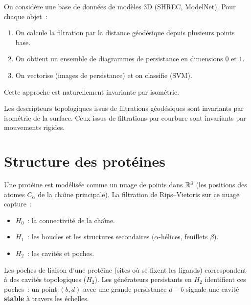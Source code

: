\begin{exemple}
On consid\`ere une base de donn\'ees de mod\`eles 3D (SHREC, ModelNet).
Pour chaque objet~:
\begin{enumerate}
  \item On calcule la filtration par la distance g\'eod\'esique depuis
        plusieurs points base.
  \item On obtient un ensemble de diagrammes de persistance en
        dimensions $0$ et $1$.
  \item On vectorise (images de persistance) et on classifie (SVM).
\end{enumerate}
Cette approche est naturellement invariante par isom\'etrie.
\end{exemple}

\begin{proposition}[Invariance]
Les descripteurs topologiques issus de filtrations g\'eod\'esiques
sont invariants par isom\'etrie de la surface. Ceux issus de
filtrations par courbure sont invariants par mouvements rigides.
\end{proposition}

\section{Structure des prot\'eines}
\label{sec:proteines}

\begin{definition}
Une prot\'eine est mod\'elis\'ee comme un nuage de points dans $\mathbb{R}^3$
(les positions des atomes $C_\alpha$ de la cha\^\i ne principale).
La filtration de Rips--Vietoris sur ce nuage capture~:
\begin{itemize}
  \item $H_0$~: la connectivit\'e de la cha\^\i ne.
  \item $H_1$~: les boucles et les structures secondaires
        ($\alpha$-h\'elices, feuillets $\beta$).
  \item $H_2$~: les cavit\'es et poches.
\end{itemize}
\end{definition}

\begin{exemple}
Les poches de liaison d'une prot\'eine (sites o\`u se fixent les
ligands) correspondent \`a des cavit\'es topologiques ($H_2$).
Les g\'en\'erateurs persistants en $H_2$ identifient ces poches~:
un point $(b, d)$ avec une grande persistance $d - b$ signale
une cavit\'e \textbf{stable} \`a travers les \'echelles.
\end{exemple}

